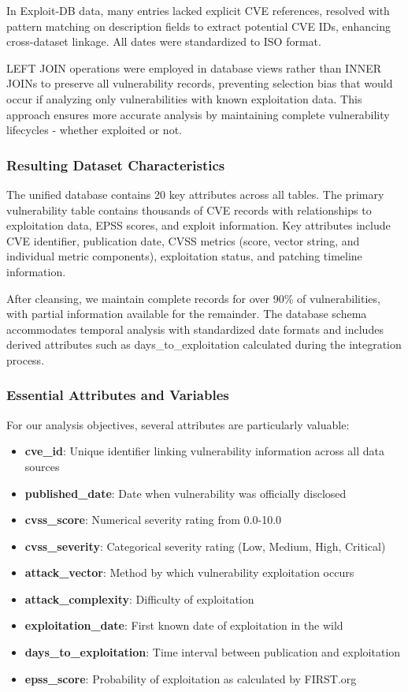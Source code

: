 \documentclass[runningheads]{llncs}
\begin{document}
In Exploit-DB data, many entries lacked explicit CVE references, resolved with pattern matching on description fields to extract potential CVE IDs, enhancing cross-dataset linkage. All dates were standardized to ISO format. 

LEFT JOIN operations were employed in database views rather than INNER JOINs to preserve all vulnerability records, preventing selection bias that would occur if analyzing only vulnerabilities with known exploitation data. This approach ensures more accurate analysis by maintaining complete vulnerability lifecycles - whether exploited or not.

\subsubsection{Resulting Dataset Characteristics}
The unified database contains 20 key attributes across all tables. The primary vulnerability table contains thousands of CVE records with relationships to exploitation data, EPSS scores, and exploit information. Key attributes include CVE identifier, publication date, CVSS metrics (score, vector string, and individual metric components), exploitation status, and patching timeline information.

After cleansing, we maintain complete records for over 90\% of vulnerabilities, with partial information available for the remainder. The database schema accommodates temporal analysis with standardized date formats and includes derived attributes such as days\_to\_exploitation calculated during the integration process.

\subsubsection{Essential Attributes and Variables}
For our analysis objectives, several attributes are particularly valuable:

\begin{itemize}
    \item \textbf{cve\_id}: Unique identifier linking vulnerability information across all data sources
    \item \textbf{published\_date}: Date when vulnerability was officially disclosed
    \item \textbf{cvss\_score}: Numerical severity rating from 0.0-10.0
    \item \textbf{cvss\_severity}: Categorical severity rating (Low, Medium, High, Critical)
    \item \textbf{attack\_vector}: Method by which vulnerability exploitation occurs
    \item \textbf{attack\_complexity}: Difficulty of exploitation
    \item \textbf{exploitation\_date}: First known date of exploitation in the wild
    \item \textbf{days\_to\_exploitation}: Time interval between publication and exploitation
    \item \textbf{epss\_score}: Probability of exploitation as calculated by FIRST.org
\end{itemize}
\end{document}
